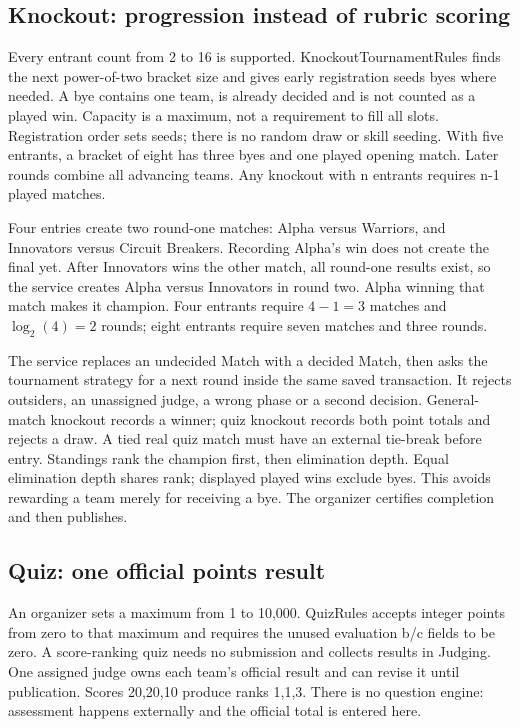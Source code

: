 \documentclass[12pt]{article}
\begin{document}
\subsection{Knockout: progression instead of rubric scoring}
Every entrant count from 2 to 16 is supported. KnockoutTournamentRules finds the next power-of-two bracket size and gives early registration seeds byes where needed. A bye contains one team, is already decided and is not counted as a played win. Capacity is a maximum, not a requirement to fill all slots. Registration order sets seeds; there is no random draw or skill seeding. With five entrants, a bracket of eight has three byes and one played opening match. Later rounds combine all advancing teams. Any knockout with n entrants requires n-1 played matches.

Four entries create two round-one matches: Alpha versus Warriors, and Innovators versus Circuit Breakers. Recording Alpha's win does not create the final yet. After Innovators wins the other match, all round-one results exist, so the service creates Alpha versus Innovators in round two. Alpha winning that match makes it champion. Four entrants require $4-1=3$ matches and $\log_2(4)=2$ rounds; eight entrants require seven matches and three rounds.

The service replaces an undecided Match with a decided Match, then asks the tournament strategy for a next round inside the same saved transaction. It rejects outsiders, an unassigned judge, a wrong phase or a second decision. General-match knockout records a winner; quiz knockout records both point totals and rejects a draw. A tied real quiz match must have an external tie-break before entry. Standings rank the champion first, then elimination depth. Equal elimination depth shares rank; displayed played wins exclude byes. This avoids rewarding a team merely for receiving a bye. The organizer certifies completion and then publishes.

\subsection{Quiz: one official points result}
An organizer sets a maximum from 1 to 10,000. QuizRules accepts integer points from zero to that maximum and requires the unused evaluation b/c fields to be zero. A score-ranking quiz needs no submission and collects results in Judging. One assigned judge owns each team's official result and can revise it until publication. Scores 20,20,10 produce ranks 1,1,3. There is no question engine: assessment happens externally and the official total is entered here.
\end{document}
